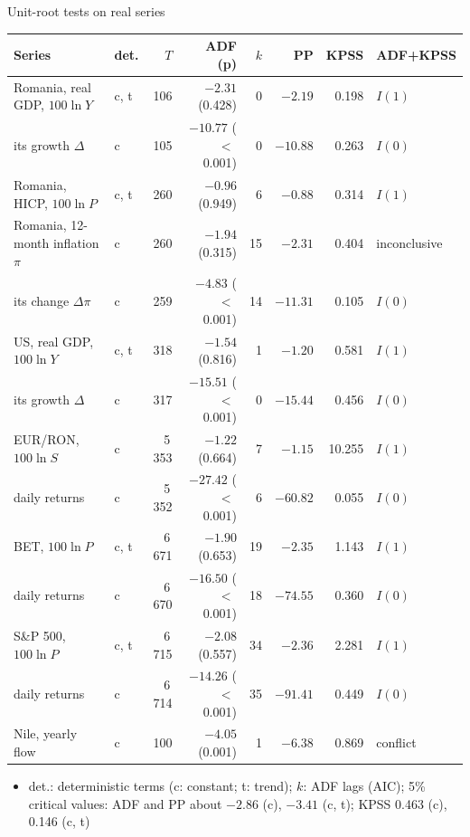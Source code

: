 \begin{frame}{Unit-root tests on real series}
\itemsize{\scriptsize}
\begin{center}
\scriptsize
\begin{tabular}{llrrrrrl}
\toprule
\textbf{Series} & \textbf{det.} & $T$ & \textbf{ADF} (p) & $k$ & \textbf{PP} & \textbf{KPSS} & \textbf{ADF+KPSS} \\
\midrule
Romania, real GDP, $100\ln Y$ & c, t & 106 & $\ensuremath{-}2.31$ (0.428) & 0 & $\ensuremath{-}2.19$ & 0.198 & $I(1)$ \\
\quad its growth $\Delta$ & c & 105 & $\ensuremath{-}10.77$ ($<$\,0.001) & 0 & $\ensuremath{-}10.88$ & 0.263 & $I(0)$ \\
Romania, HICP, $100\ln P$ & c, t & 260 & $\ensuremath{-}0.96$ (0.949) & 6 & $\ensuremath{-}0.88$ & 0.314 & $I(1)$ \\
Romania, 12-month inflation $\pi$ & c & 260 & $\ensuremath{-}1.94$ (0.315) & 15 & $\ensuremath{-}2.31$ & 0.404 & inconclusive \\
\quad its change $\Delta\pi$ & c & 259 & $\ensuremath{-}4.83$ ($<$\,0.001) & 14 & $\ensuremath{-}11.31$ & 0.105 & $I(0)$ \\
US, real GDP, $100\ln Y$ & c, t & 318 & $\ensuremath{-}1.54$ (0.816) & 1 & $\ensuremath{-}1.20$ & 0.581 & $I(1)$ \\
\quad its growth $\Delta$ & c & 317 & $\ensuremath{-}15.51$ ($<$\,0.001) & 0 & $\ensuremath{-}15.44$ & 0.456 & $I(0)$ \\
EUR/RON, $100\ln S$ & c & 5\,353 & $\ensuremath{-}1.22$ (0.664) & 7 & $\ensuremath{-}1.15$ & 10.255 & $I(1)$ \\
\quad daily returns & c & 5\,352 & $\ensuremath{-}27.42$ ($<$\,0.001) & 6 & $\ensuremath{-}60.82$ & 0.055 & $I(0)$ \\
BET, $100\ln P$ & c, t & 6\,671 & $\ensuremath{-}1.90$ (0.653) & 19 & $\ensuremath{-}2.35$ & 1.143 & $I(1)$ \\
\quad daily returns & c & 6\,670 & $\ensuremath{-}16.50$ ($<$\,0.001) & 18 & $\ensuremath{-}74.55$ & 0.360 & $I(0)$ \\
S\&P 500, $100\ln P$ & c, t & 6\,715 & $\ensuremath{-}2.08$ (0.557) & 34 & $\ensuremath{-}2.36$ & 2.281 & $I(1)$ \\
\quad daily returns & c & 6\,714 & $\ensuremath{-}14.26$ ($<$\,0.001) & 35 & $\ensuremath{-}91.41$ & 0.449 & $I(0)$ \\
Nile, yearly flow & c & 100 & $\ensuremath{-}4.05$ (0.001) & 1 & $\ensuremath{-}6.38$ & 0.869 & conflict \\
\bottomrule
\end{tabular}
\end{center}
\begin{itemize}
    \item det.: deterministic terms (c: constant; t: trend); $k$: ADF lags (AIC); 5\% critical values: ADF and PP about $-2.86$ (c), $-3.41$ (c, t); KPSS 0.463 (c), 0.146 (c, t)
\end{itemize}
\end{frame}

